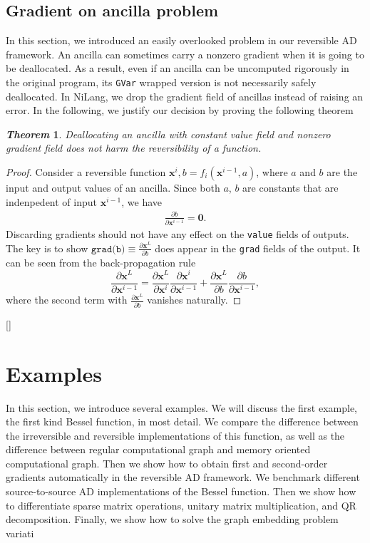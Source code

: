\documentclass[aps,twocolumn,longbibliography,english,superscriptaddress]{revtex4-1}
\newcommand{\<}{\langle}
\renewcommand{\>}{\rangle}
\newcommand{\vx}{{\mathbf{x}}}
\newcommand{\blue}[1]{[{\bf  \color{blue}{JG: #1}}]}
\newtheorem{theorem}{\textit{Theorem}}
\theoremstyle{definition}\newtheorem{definition}{\textit{Definition}}
\begin{document}
\subsection{Gradient on ancilla problem}
In this section, we introduced an easily overlooked problem in our reversible AD framework.
An ancilla can sometimes carry a nonzero gradient when it is going to be deallocated. As a result, even if an ancilla can be uncomputed rigorously in the original program, its \texttt{GVar} wrapped version is not necessarily safely deallocated.
In NiLang, we drop the gradient field of ancillas instead of raising an error.
In the following, we justify our decision by proving the following theorem
\begin{theorem}
    Deallocating an ancilla with constant value field and nonzero gradient field does not harm the reversibility of a function.
\end{theorem}
\begin{proof}
    Consider a reversible function $\vx^i, b = f_i(\vx^{i-1}, a)$, where $a$ and $b$ are the input and output values of an ancilla.
    Since both $a$, $b$ are constants that are indenpedent of input $\vx^{i-1}$, we have
\begin{align}
    \frac{\partial b}{\partial \vx^{i-1}} = \mathbf{0}.
\end{align}
Discarding gradients should not have any effect on the \texttt{value} fields of outputs.
    The key is to show $\texttt{grad(b)} \equiv \frac{\partial \vx^L}{\partial{b}}$ does appear in the \texttt{grad} fields of the output. It can be seen from the back-propagation rule 
\begin{equation}
    \frac{\partial \vx^L}{\partial \vx^{i-1}} = \frac{\partial \vx^L}{\partial \vx^i}\frac{\partial \vx^i}{\partial \vx^{i-1}} + \frac{\partial \vx^L}{\partial b}\frac{\partial b}{\partial \vx^{i-1}},
\end{equation}
where the second term with $\frac{\partial \vx^L}{\partial{b}}$ vanishes naturally.
\end{proof}

\blue{Grammarly here!}

\section{Examples}\label{sec:example}

In this section, we introduce several examples.
We will discuss the first example, the first kind Bessel function, in most detail.
We compare the difference between the irreversible and reversible implementations of this function, as well as the difference between regular computational graph and memory oriented computational graph.
Then we show how to obtain first and second-order gradients automatically in the reversible AD framework.
We benchmark different source-to-source AD implementations of the Bessel function.
Then we show how to differentiate sparse matrix operations, unitary matrix multiplication, and QR decomposition.
Finally, we show how to solve the graph embedding problem variati
\end{document}
